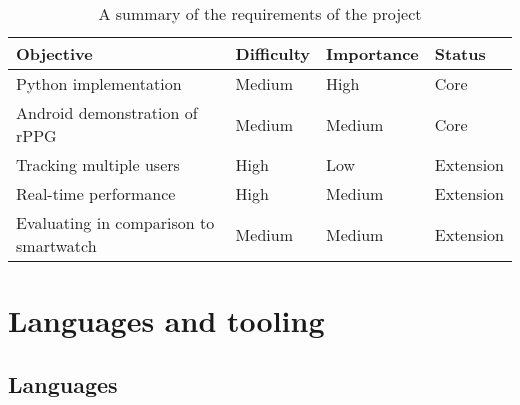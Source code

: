 \begin{table}[H]
    \centering
    \begin{tabular}{|l|l|l|l|}
    \hline
    \textbf{Objective} & \textbf{Difficulty} & \textbf{Importance} & \textbf{Status} \\ \hline
    Python implementation & {\color[HTML]{F56B00} Medium} & {\color[HTML]{CB0000} High} & {\color[HTML]{CB0000} Core} \\ \hline
    Android demonstration of rPPG & {\color[HTML]{F56B00} Medium} & {\color[HTML]{F56B00} Medium} & {\color[HTML]{CB0000} Core} \\ \hline
    Tracking multiple users & {\color[HTML]{CB0000} High} & {\color[HTML]{009901} Low} & {\color[HTML]{009901} Extension} \\ \hline
    Real-time performance & {\color[HTML]{CB0000} High} & {\color[HTML]{F56B00} Medium} & {\color[HTML]{009901} Extension} \\ \hline
    Evaluating in comparison to smartwatch & {\color[HTML]{F56B00} Medium} & {\color[HTML]{F56B00} Medium} & {\color[HTML]{009901} Extension} \\ \hline
    \end{tabular}
    \caption{A summary of the requirements of the project}
\end{table}



\section{Languages and tooling}
\subsection{Languages}

